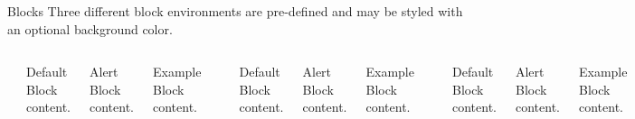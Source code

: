\documentclass[aspectratio=169]{beamer}
\begin{document}
	\begin{frame}[fragile]{Blocks}
		Three different block environments are pre-defined and may be styled with an optional background color.
		
		\begin{columns}[T,onlytextwidth]
		 	\begin{verbatim}\gothamset{
				block=native}\end{verbatim}

		   \begin{block}{Default}
		     Block content.
		   \end{block}
		
		   \begin{alertblock}{Alert}
		     Block content.
		   \end{alertblock}
		
		   \begin{exampleblock}{Example}
		     Block content.
		   \end{exampleblock}
		
		
			\begin{verbatim}\gothamset{
				block=transparent}\end{verbatim}
		
		   \begin{block}{Default}
		     Block content.
		   \end{block}
		
		   \begin{alertblock}{Alert}
		     Block content.
		   \end{alertblock}
		
		   \begin{exampleblock}{Example}
		     Block content.
		   \end{exampleblock}

		
			\begin{verbatim}\gothamset{
				block=fill}\end{verbatim}
		
		   \begin{block}{Default}
		     Block content.
		   \end{block}
		
		   \begin{alertblock}{Alert}
		     Block content.
		   \end{alertblock}
		
		   \begin{exampleblock}{Example}
		     Block content.
		   \end{exampleblock}
		
		\end{columns}
	\end{frame}
\end{document}
